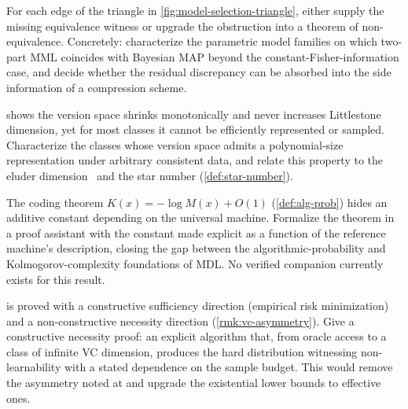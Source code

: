 \begin{openprob}
\label{op:model-selection}
For each edge of the triangle in \cref{fig:model-selection-triangle}, either supply the missing equivalence witness or upgrade the obstruction into a theorem of non-equivalence. Concretely: characterize the parametric model families on which two-part MML coincides with Bayesian MAP beyond the constant-Fisher-information case, and decide whether the residual discrepancy can be absorbed into the side information of a compression scheme.
\end{openprob}

\begin{openprob}
\label{op:version-space}
 shows the version space shrinks monotonically and never increases Littlestone dimension, yet for most classes it cannot be efficiently represented or sampled. Characterize the classes whose version space admits a polynomial-size representation under arbitrary consistent data, and relate this property to the eluder dimension~\cite{RussoVanRoy2013} and the star number (\cref{def:star-number}).
\end{openprob}

\begin{openprob}
\label{op:solomonoff}
The coding theorem $K(x) = -\log M(x) + O(1)$ (\cref{def:alg-prob}) hides an additive constant depending on the universal machine. Formalize the theorem in a proof assistant with the constant made explicit as a function of the reference machine's description, closing the gap between the algorithmic-probability and Kolmogorov-complexity foundations of MDL. No verified companion currently exists for this result.
\end{openprob}

\begin{openprob}
\label{op:asymmetry}
 is proved with a constructive sufficiency direction (empirical risk minimization) and a non-constructive necessity direction (\cref{rmk:vc-asymmetry}). Give a constructive necessity proof: an explicit algorithm that, from oracle access to a class of infinite VC dimension, produces the hard distribution witnessing non-learnability with a stated dependence on the sample budget. This would remove the asymmetry noted at  and upgrade the existential lower bounds to effective ones.
\end{openprob}


